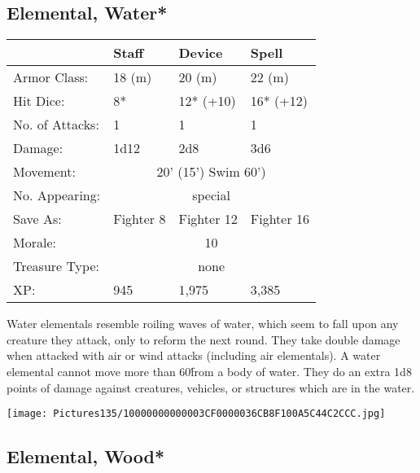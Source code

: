 \documentclass[a4paper,twoside,openany,10pt]{book}
\begin{document}
\begin{multicols}{2}
\subsection*{Elemental, Water*}\label{elemental-water}

\begin{tabularx}{0.48\textwidth}{@{}lllX@{}}
& Staff & Device & Spell \\\hline
Armor Class: & 18 (m) & 20 (m) & 22 (m) \\\hline
Hit Dice: & 8* & 12* (+10) & 16* (+12) \\\hline
No. of Attacks: & 1 & 1 & 1 \\\hline
Damage: & 1d12 & 2d8 & 3d6 \\\hline
Movement:  & \multicolumn{3}{c}{20' (15') Swim 60')}\\\hline
No. Appearing: &\multicolumn{3}{c}{special} \\\hline
Save As: & Fighter 8 & Fighter 12 & Fighter 16 \\\hline
Morale: & \multicolumn{3}{c}{10} \\\hline
Treasure Type: & \multicolumn{3}{c}{none} \\\hline
XP: & 945 & 1,975 & 3,385 \\\hline
\end{tabularx}\medskip

Water elementals resemble roiling waves of water, which seem to fall upon any creature they attack, only to reform the next round. They take double damage when attacked with air or wind attacks (including air elementals). A water elemental cannot move more than 60\' from a body of water. They do an extra 1d8 points of damage against creatures, vehicles, or structures which are in the water.


\begin{center}
	\texttt{[image: Pictures135/10000000000003CF0000036CB8F100A5C44C2CCC.jpg]}
\end{center}

\columnbreak

\subsection*{Elemental, Wood*}\label{elemental-wood}


\end{multicols}
\end{document}
